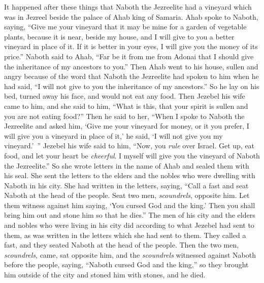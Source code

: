 \begin{biblechapter} %
 It happened after these things that Naboth the Jezreelite had a vineyard which was in Jezreel beside the palace of Ahab king of Samaria.
\verse Ahab spoke to Naboth, saying, “Give me your vineyard that it may be mine for a garden of vegetable plants, because it is near, beside my house, and I will give to you a better vineyard in place of it. If it is better in your eyes, I will give you the money of its price.”
\verse Naboth said to Ahab, “Far be it from me from Adonai that I should give the inheritance of my ancestors to you.”
\verse Then Ahab went to his house, sullen and angry because of the word that Naboth the Jezreelite had spoken to him when he had said, “I will not give to you the inheritance of my ancestors.” So he lay on his bed, turned away his face, and would not eat any food.
\verse Then Jezebel his wife came to him, and she said to him, “What is this, that your spirit is sullen and you are not eating food?”
\verse Then he said to her, “When I spoke to Naboth the Jezreelite and asked him, ‘Give me your vineyard for money, or it you prefer, I will give you a vineyard in place of it,’ he said, ‘I will not give you my vineyard.’ ”
\verse Jezebel his wife said to him, “Now, you \textit{rule} over Israel. Get up, eat food, and let your heart be \textit{cheerful}. I myself will give you the vineyard of Naboth the Jezreelite.”
\verse So she wrote letters in the name of Ahab and sealed them with his seal. She sent the letters to the elders and the nobles who were dwelling with Naboth in his city.
\verse She had written in the letters, saying, “Call a fast and seat Naboth at the head of the people.
\verse Seat two men, \textit{scoundrels}, opposite him. Let them witness against him saying, ‘You cursed God and the king.’ Then you shall bring him out and stone him so that he dies.”
\verse The men of his city and the elders and nobles who were living in his city did according to what Jezebel had sent to them, as was written in the letters which she had sent to them.
\verse They called a fast, and they seated Naboth at the head of the people.
\verse Then the two men, \textit{scoundrels}, came, sat opposite him, and the \textit{scoundrels} witnessed against Naboth before the people, saying, “Naboth cursed God and the king,” so they brought him outside of the city and stoned him with stones, and he died.

\end{biblechapter}
